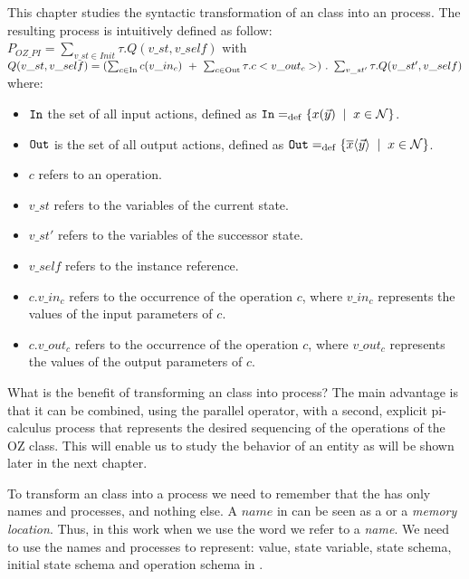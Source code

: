 This chapter studies the syntactic transformation of an \oz{} class into an \picalc{} process. The resulting process is intuitively defined as follow:\\
$P_{OZ\_PI} = \sum_{v\_st\in Init}^{} \tau. Q(v\_st,v\_self)$ with
$\\Q(v\_st,v\_self) = (\sum_{c\in \text{In}}^{} c(v\_in_{c}) \ +\ \sum_{c\in \text{Out}}^{} \tau.c<v\_out_{c}>)\ .\ \sum_{v\_st'}^{} \tau.Q(v\_st',v\_self)$
where:
\begin{itemize}
\item $\mathtt{In}$ the set of all input actions, defined as $\inA\define\set[x\in\names]{\inp{x}{\vec{y}}}$.
\item $\mathtt{Out}$ is the set of all output actions, defined as $\outA\define\set[x\in\names]{\out{x}{\vec{y}}}$.
\item $c$ refers to an operation.
\item $v\_st$ refers to the variables of the current state.
\item $v\_st'$ refers to the variables of the successor state.
\item $v\_self$ refers to the instance reference.
\item $c.v\_in_{c}$ refers to the occurrence of the operation $c$, where $v\_in_{c}$ represents the values of the input parameters of $c$.
\item $c.v\_out_{c}$ refers to the occurrence of the operation $c$, where $v\_out_{c}$ represents the values of the output parameters of $c$.
\end{itemize}

What is the benefit of transforming an \oz{} class into \picalc{} process? The main advantage is that it can be combined, using the
parallel operator, with a second, explicit pi-calculus
process that represents the desired sequencing of the operations
of the OZ class. This will enable us to study the behavior of an entity as will be shown later in the next chapter.

To transform an \oz{} class into a \picalc{} process we need to remember that the \picalc{} has only names and processes, and nothing else. A $name$ in \picalc{} can be seen as a  or a \textit{memory location}. Thus, in this work when we use the word  we refer to a \picalc{} \textit{name}. We need to use the names and processes to represent: value, state variable, state schema, initial state schema and operation schema in \picalc{}.
\section{}
\label{sec_tra_mapping_values}


